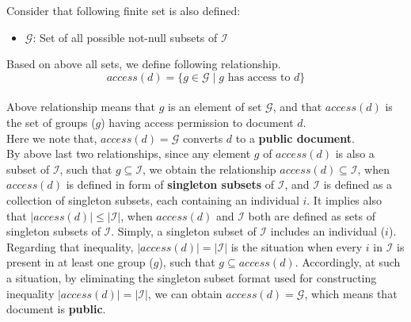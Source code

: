 \documentclass{article}
\begin{document}
\noindent
Consider that following finite set is also defined:
\begin{itemize}
    \item $\mathcal{G}$: Set of all possible not-null subsets of $\mathcal{I}$
\end{itemize}
Based on above all sets, we define following relationship.
\[ access(d) = \{ g \in \mathcal{G} \mid g \text{ has access to } d \} \] \\ 
\noindent
Above relationship means that $g$ is an element of set $\mathcal{G}$, and that $access(d)$ is the set of groups ($g$) having access permission to document $d$.\\ 
Here we note that, $access(d) = \mathcal{G}$ converts $d$ to a \textbf{public document}. \\ 

By above last two relationships, since any element $g$ of $access(d)$ is also a subset of $\mathcal{I}$, such that $g \subseteq \mathcal{I}$, we obtain the relationship $access(d) \subseteq \mathcal{I}$, when $access(d)$ is defined in form of \textbf{singleton subsets} of $\mathcal{I}$, and $\mathcal{I}$ is defined as a collection of singleton subsets, each containing an individual $i$. It implies also that $|access(d)| \leq |\mathcal{I}|$, when $access(d)$ and $\mathcal{I}$ both are defined as sets of singleton subsets of $\mathcal{I}$. Simply, a singleton subset of $\mathcal{I}$ includes an individual ($i$).  \\
Regarding that inequality, $|access(d)| = |\mathcal{I}|$ is the situation when every $i$ in $\mathcal{I}$ is present in at least one group ($g$), such that $g \subseteq access(d)$. Accordingly, at such a situation, by eliminating the singleton subset format used for constructing inequality $|access(d)| = |\mathcal{I}|$, we can obtain $access(d) = \mathcal{G}$, which means that document is \textbf{public}.\\ \\ 

\end{document}
